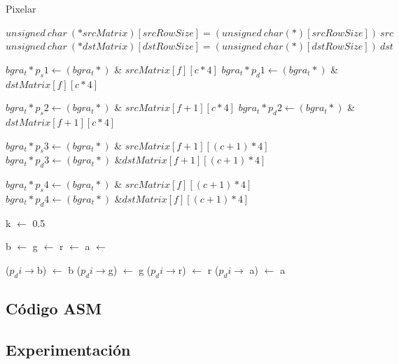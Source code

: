 	\begin{algorithm}[h!]
\caption{Pixelar}
\begin{algorithmic}
	\State $unsigned~ char~ (*srcMatrix)[srcRowSize] = (unsigned~ char (*)[srcRowSize])~ src$
	\State $unsigned~ char~ (*dstMatrix)[dstRowSize] = (unsigned~ char (*)[dstRowSize])~ dst$
	
			\State $bgra_t* p_s1 \gets (bgra_t*)$ \& $srcMatrix[f][c * 4]$
			\State $bgra_t *p_d1 \gets (bgra_t*)$ \&$dstMatrix[f][c * 4]$
			
			\State $bgra_t* p_s2 \gets (bgra_t*)$ \& $srcMatrix[f+1][c * 4]$
			\State $bgra_t *p_d2 \gets (bgra_t*)$ \&$dstMatrix[f+1][c * 4]$
			
			\State $bgra_t* p_s3 \gets (bgra_t*)$ \& $srcMatrix[f+1][(c+1) * 4]$
			\State $bgra_t *p_d3 \gets (bgra_t*)$ \&$dstMatrix[f+1][(c+1) * 4]$
			
			\State $bgra_t* p_s4 \gets (bgra_t*)$ \& $srcMatrix[f][(c+1) * 4]$
			\State $bgra_t *p_d4 \gets (bgra_t*)$ \&$dstMatrix[f][(c+1) * 4]$
			
			\State k $\gets$ 0.5
			
			\State b $\gets$ 
			\State g $\gets$ 
			\State r $\gets$ 
			\State a $\gets$ 
				
				\State ($p_di \rightarrow$b) $\gets$ b
				\State ($p_di \rightarrow$g) $\gets$ g
				\State ($p_di \rightarrow$r) $\gets$ r
				\State ($p_di \rightarrow$ a) $\gets$ a
			\EndFor
		\EndFor
	\EndFor
\EndFunction

\end{algorithmic} 
\end{algorithm}
\subsection{Código ASM}
	
	
	
\subsection{Experimentación}
